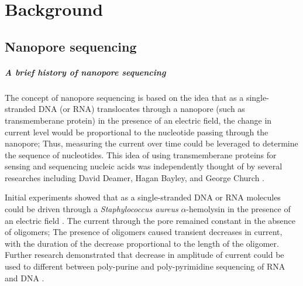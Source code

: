 \chapter{Background}
\label{ch2}

\section{Nanopore sequencing}

\paragraph{A brief history of nanopore sequencing}
The concept of nanopore sequencing is based on the idea that as a
single-stranded DNA (or RNA) translocates through a nanopore (such as
transmemberane protein) in the presence of an electric field, the change
in current level would be proportional to the nucleotide passing through
the nanopore; Thus, measuring the current over time could be leveraged
to determine the sequence of nucleotides.
%
This idea of using transmemberane proteins for sensing and sequencing
nucleic acids was independently thought of by several researches
including David Deamer, Hagan Bayley, and George Church
\citep{deamer2016three,bayley2015nanopore,branton2010potential}.

Initial experiments showed that as a single-stranded DNA or RNA
molecules could be driven through a \emph{Staphylococcus aureus}
$\alpha$-hemolysin in the presence of an electric field
\citep{kasianowicz1996characterization}. The current through the pore
remained constant in the absence of oligomers; The presence of oligomers
caused transient decreases in current, with the duration of the decrease
proportional to the length of the oligomer.
Further research demonstrated that decrease in amplitude of current
could be used to different between poly-purine and poly-pyrimidine
sequencing of RNA \citep{akeson1999microsecond} and DNA
\citep{meller2000rapid}.


